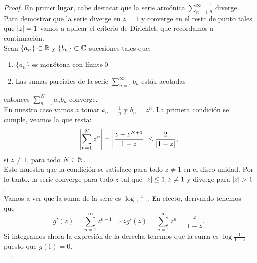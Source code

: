 \begin{proof}
    En primer lugar, cabe destacar que la serie armónica $\sum_{n=1}^{\infty} \frac{1}{n}$ diverge. Para demostrar que la serie diverge en $z = 1$  y converge en el resto de punto tales que $\left\lvert z\right\rvert = 1$ vamos a aplicar el criterio de Dirichlet, que recordamos a continuación. \\

    Sean $\{a_n\} \subset \mathbb{R}$ y $\{b_n\} \subset \mathbb{C}$ sucesiones tales que:
    \begin{enumerate}
        \item $\{a_n\}$ es monótona con límite $0$
        \item Las sumas parciales de la serie $\sum_{n=1}^{\infty} b_n$ están acotadas
    \end{enumerate}
    entonces $\sum_{n=1}^{N} a_nb_n$ converge. \\

    En nuestro caso vamos a tomar $a_n = \frac{1}{n}$ y $b_n = z^n$. La primera condición se cumple, veamos la que resta:
    \begin{equation*}
        \left\lvert\sum_{n=1}^{N} z^n\right\rvert = \left\lvert\frac{z - z^{N+1}}{1 - z}\right\rvert \leq \frac{2}{\left\lvert1 - z\right\rvert},
    \end{equation*}
    si $z \neq 1$, para todo $N \in \mathbb{N}$. \\

    Esto muestra que la condición se satisface para todo $z \not = 1$ en el disco unidad. Por lo tanto, la serie converge para todo $z$ tal que $\left\lvert z\right\rvert \leq 1, z \not = 1$ y diverge para $\left\lvert z\right\rvert > 1$. \\

    Vamos a ver que la suma de la serie es $\log{\frac{1}{1 - z}}$. En efecto, derivando tenemos que
    \begin{equation*}
        g'(z) = \sum_{n=1}^{\infty} z^{n-1} \Rightarrow z g'(z) = \sum_{n=1}^{\infty} z^n = \frac{z}{1 - z}.
     \end{equation*}
     Si integramos ahora la expresión de la derecha tenemos que la suma es $\log{\frac{1}{1 - z}}$ puesto que $g(0) = 0$. \\
\end{proof}

